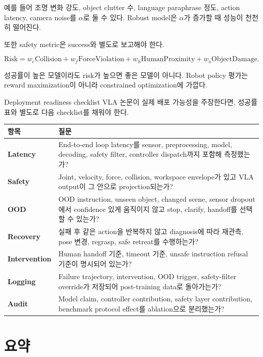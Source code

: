 예를 들어 조명 변화 강도, object clutter 수, language paraphrase 정도, action latency, camera noise를 $\alpha$로 둘 수 있다. Robust model은 $\alpha$가 증가할 때 성능이 천천히 떨어진다.

또한 safety metric은 success와 별도로 보고해야 한다.

\begin{equation}
  \mathrm{Risk}
  =
  w_c \mathrm{Collision}
  +
  w_f \mathrm{ForceViolation}
  +
  w_h \mathrm{HumanProximity}
  +
  w_o \mathrm{ObjectDamage}.
\end{equation}

성공률이 높은 모델이라도 risk가 높으면 좋은 모델이 아니다. Robot policy 평가는 reward maximization이 아니라 constrained optimization에 가깝다.

\begin{casebox}{Deployment readiness checklist}
VLA 논문이 실제 배포 가능성을 주장한다면, 성공률 표와 별도로 다음 checklist를 채워야 한다.

\vspace{0.5em}
\begin{tabularx}{\linewidth}{>{\bfseries}p{27mm}X}
  \toprule
  항목 & 질문 \\
  \midrule
  Latency & End-to-end loop latency를 sensor, preprocessing, model, decoding, safety filter, controller dispatch까지 포함해 측정했는가? \\
  Safety & Joint, velocity, force, collision, workspace envelope가 있고 VLA output이 그 안으로 projection되는가? \\
  OOD & OOD instruction, unseen object, changed scene, sensor dropout에서 confidence 있게 움직이지 않고 stop, clarify, handoff를 선택할 수 있는가? \\
  Recovery & 실패 후 같은 action을 반복하지 않고 diagnosis에 따라 재관측, pose 변경, regrasp, safe retreat를 수행하는가? \\
  Intervention & Human handoff 기준, timeout 기준, unsafe instruction refusal 기준이 명시되어 있는가? \\
  Logging & Failure trajectory, intervention, OOD trigger, safety-filter override가 저장되어 post-training data로 돌아가는가? \\
  Audit & Model claim, controller contribution, safety layer contribution, benchmark protocol effect를 ablation으로 분리했는가? \\
  \bottomrule
\end{tabularx}
\end{casebox}

\section{요약}

